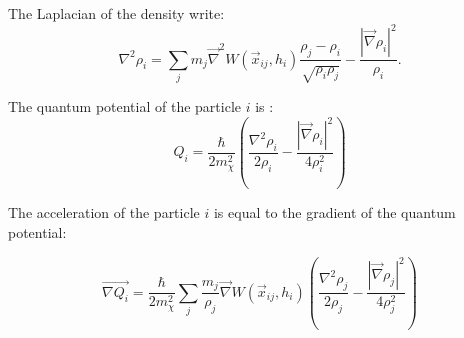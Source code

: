 The Laplacian of the density write:
%
\begin{equation}
  \label{eq:uldm:laplacian_rho}
  \nabla^2 \rho_i =  \sum_j m_j \vec{\nabla}^2 W(\vec{x}_{ij}, h_i) \frac{\rho_j - \rho_i}{\sqrt{\rho_i \rho_j}} - \frac{|\vec{\nabla}\rho_i|^2}{\rho_i}.
\end{equation}

\noindent
The quantum potential of the particle $i$ is :
%
\begin{equation}
  \label{eq:uldm:grad_Q}
  Q_i =  \frac{\hbar}{2 m^2_\chi }  \left( \frac{\nabla^2\rho_i}{2\rho_i} -\frac{|\vec{\nabla}\rho_i|^2}{4\rho^2_i} \right)
\end{equation}


The acceleration of the particle $i$ is equal to the gradient of the quantum potential:

\begin{equation}
  \label{eq:uldm:grad_Q}
  \vec{\nabla{Q_i}} =  \frac{\hbar}{2 m^2_\chi }  \sum_j \frac{m_j}{\rho_j}\vec{\nabla} W(\vec{x}_{ij}, h_i)
  \left( \frac{\nabla^2\rho_j}{2\rho_j} -\frac{|\vec{\nabla}\rho_j|^2}{4\rho^2_j} \right)
\end{equation}



